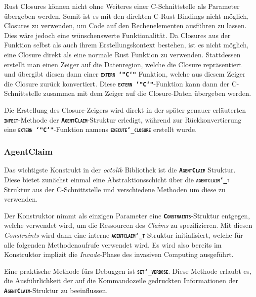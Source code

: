 Rust Closures können nicht ohne Weiteres einer C-Schnittstelle als Parameter übergeben werden.
Somit ist es mit den direkten C-Rust Bindings nicht möglich, Closures zu verwenden,
um Code auf den Rechenelementen ausführen zu lassen. Dies wäre jedoch eine
wünschenswerte Funktionalität. Da Closures aus der Funktion selbst als auch ihrem
Erstellungskontext bestehen\cite{embeddedRustOS}, ist es nicht möglich,
eine Closure direkt als eine normale Rust Funktion zu verwenden.
Stattdessen erstellt man einen Zeiger auf die Datenregion,
welche die Closure repräsentiert und übergibt diesen dann einer
\texttt{\textsc{\textbf{extern \char`"C\char`"}}} Funktion, welche aus diesem Zeiger die Closure zurück konvertiert.
Diese \texttt{\textsc{\textbf{extern \char`"C\char`"}}}-Funktion kann dann der C-Schnittstelle zusammen mit dem
Zeiger auf die Closure-Daten übergeben werden.

Die Erstellung des Closure-Zeigers wird direkt in der später genauer erläuterten
\texttt{\textsc{\textbf{infect}}}-Methode der \texttt{\textsc{\textbf{AgentClaim}}}-Struktur
erledigt, während zur Rückkonvertierung eine \texttt{\textsc{\textbf{extern \char`"C\char`"}}}-Funktion namens \texttt{\textsc{\textbf{execute\char`_closure}}} erstellt wurde.

\subsubsection{AgentClaim}

Das wichtigste Konstrukt in der \textit{octolib} Bibliothek ist die \texttt{\textsc{\textbf{AgentClaim}}} Struktur.
Diese bietet zunächst einmal eine Abstraktionsschicht über die \texttt{\textsc{\textbf{agentclaim\char`_t}}}
Struktur aus der C-Schnittstelle und verschiedene Methoden um diese zu verwenden.

Der Konstruktor nimmt als einzigen Parameter eine \texttt{\textsc{\textbf{Constraints}}}-Struktur entgegen,
welche verwendet wird, um die Ressourcen des \textit{Claims} zu spezifizieren.
Mit diesen \textit{Constraints} wird dann eine interne
\texttt{\textsc{\textbf{agentclaim\char`_t}}}-Struktur initialisiert,
welche für alle folgenden Methodenaufrufe verwendet wird. Es wird also bereits im Konstruktor implizit die
\textit{Invade}-Phase des invasiven Computing ausgeführt.

Eine praktische Methode fürs Debuggen ist \texttt{\textsc{\textbf{set\char`_verbose}}}.
Diese Methode erlaubt es, die Ausführlichkeit der auf die Kommandozeile gedruckten Informationen der
\texttt{\textsc{\textbf{AgentClaim}}}-Struktur zu beeinflussen.

